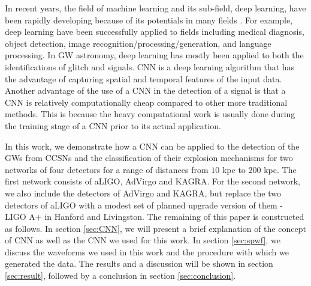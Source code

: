 \documentclass[aps,twocolumn,showpacs,groupedaddress, nofootinbib]{revtex4}  %
\begin{document}
In recent years, the field of machine learning and its sub-field, deep learning, have been rapidly developing because of 
its potentials in many fields \cite{krizhevsky2012imagenet, NIPS2014_5423, simonyan2014very, chen2014semantic, zeiler2014visualizing, szegedy2015going}.
For example, deep learning have been successfully applied to fields including medical diagnosis\cite{kononenko2001machine}, object detection\cite{redmon2016you}, image recognition/processing/generation\cite{he2016deep, krizhevsky2012imagenet, zhang2016colorful, karpathy2015deep},    and  language processing\cite{lample2016neural}.
In \ac{GW} astronomy, deep learning has mostly been applied to both the identifications of glitch\cite{mukund2017transient, zevin2017gravity, george2017deep, gabbard2018matching} and signals\cite{george2018deep, astone2018new}. 
\ac{CNN} is a deep learning algorithm that has the advantage of capturing spatial and temporal features of the input data.
Another advantage of the use of a \ac{CNN} in the detection of a signal is that a \ac{CNN} is relatively computationally cheap compared to other more traditional methods.
This is because the heavy computational work is usually done during the training stage of a \ac{CNN} prior to its actual application\cite{goodfellow2016deep}.

In this work, we demonstrate how a \ac{CNN} can be applied to the detection of the \acp{GW} from \acp{CCSN}
and the classification of their explosion mechanisms for two networks of four detectors for a range of distances from $10$ kpc to $200$ kpc.
The first network consists of \ac{aLIGO}, \ac{AdVirgo} and KAGRA.
For the second network, we also include the detectors of \ac{AdVirgo} and KAGRA,  but replace the two detectors of \ac{aLIGO} with 
a modest set of planned upgrade version of them - LIGO A+ in Hanford and Livingston\cite{miller2015prospects, LIGOW}.
The remaining of this paper is constructed as follows. 
In section \ref{sec:CNN}, we will present a brief explanation of the concept of \ac{CNN} as well as the \ac{CNN} we used for this work.
In section \ref{sec:spwf}, we discuss the waveforms we used in this work and the procedure with which we generated the data.
The results and a discussion  will be shown in section \ref{sec:result}, followed by
a conclusion in section \ref{sec:conclusion}.
\end{document}

